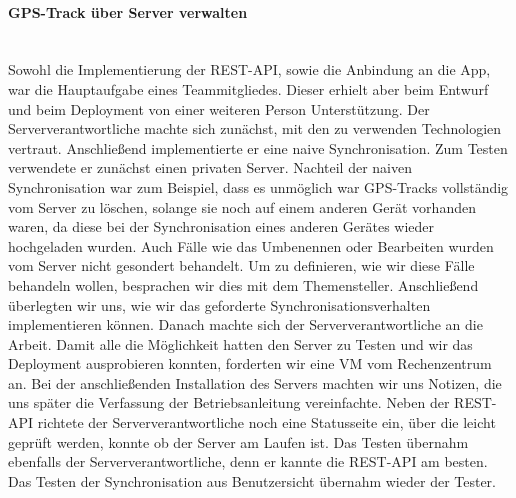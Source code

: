 \documentclass[10pt]{article}
\begin{document}
\paragraph{GPS-Track über Server verwalten} \quad\\
Sowohl die Implementierung der REST-API, sowie die Anbindung an die App, war die Hauptaufgabe eines Teammitgliedes. 
Dieser erhielt aber beim Entwurf und beim Deployment von einer weiteren Person Unterstützung. 
Der Serververantwortliche machte sich zunächst, mit den zu verwenden Technologien vertraut.
Anschließend implementierte er eine naive Synchronisation. Zum Testen verwendete er zunächst einen privaten Server. 
Nachteil der naiven Synchronisation war zum Beispiel, dass es unmöglich war GPS-Tracks vollständig vom Server zu löschen, 
solange sie noch auf einem anderen Gerät vorhanden waren, da diese bei der Synchronisation eines anderen Gerätes 
wieder hochgeladen wurden. Auch Fälle wie das Umbenennen oder Bearbeiten wurden vom Server nicht gesondert behandelt.
Um zu definieren, wie wir diese Fälle behandeln wollen, besprachen wir dies mit dem Themensteller. Anschließend 
überlegten wir uns, wie wir das geforderte Synchronisationsverhalten implementieren können. Danach machte sich der 
Serververantwortliche an die Arbeit. Damit alle die Möglichkeit hatten den Server zu Testen und wir das Deployment 
ausprobieren konnten, forderten wir eine VM vom Rechenzentrum an. Bei der anschließenden Installation des Servers 
machten wir uns Notizen, die uns später die Verfassung der Betriebsanleitung vereinfachte. 
Neben der REST-API richtete der Serververantwortliche noch eine Statusseite ein, über die leicht geprüft werden, konnte 
ob der Server am Laufen ist. Das Testen übernahm ebenfalls der Serververantwortliche, denn er kannte die REST-API am besten.
Das Testen der Synchronisation aus Benutzersicht übernahm wieder der Tester.
\end{document}
